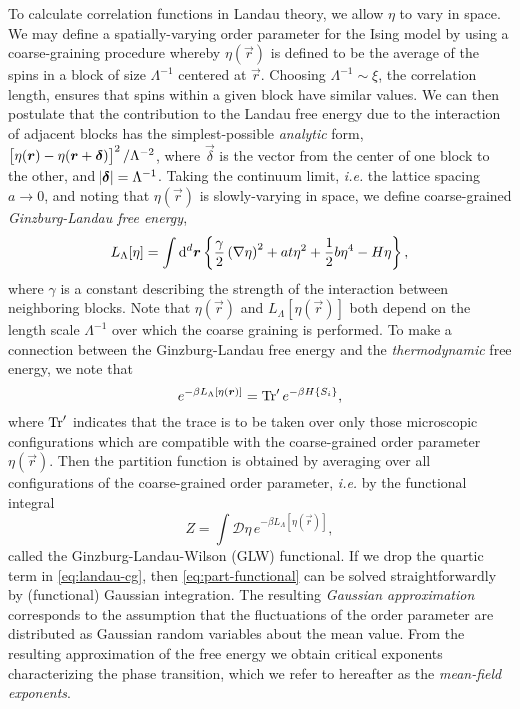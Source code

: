 To calculate correlation functions in Landau theory, we allow $\eta$ to vary in
space. We may define a spatially-varying order parameter for the Ising model by
using a coarse-graining procedure whereby $\eta(\vec{r})$ is defined to be the
average of the spins in a block of size $\Lambda^{-1}$ centered at $\vec{r}$.
Choosing $\Lambda^{-1} \sim \xi$, the correlation length, ensures that spins
within a given block have similar values. We can then postulate that the
contribution to the Landau free energy due to the interaction of adjacent
blocks has the simplest-possible \emph{analytic} form, $\left[\eta(\bm{r}) -
  \eta(\bm{r} + \bm{\delta})\right]^2/\Lambda^{-2}$, where $\vec{\delta}$ is the
vector from the center of one block to the other, and
$\abs{\bm{\delta}}=\Lambda^{-1}$. Taking the continuum limit, \textit{i.e.}
the lattice spacing $a \to 0$, and noting that $\eta(\vec{r})$ is
slowly-varying in space, we define coarse-grained \emph{Ginzburg-Landau free
  energy},
\begin{equation}
  L_{\Lambda}[\eta]
  = \int\dif^d \vec{r}
  \cbr{\frac{\gamma}{2}\del{
      \nabla\eta}^2 + a t \eta^2 + \frac{1}{2} b \eta^4 - H \eta},
  \label{eq:landau-cg}
\end{equation}
where $\gamma$ is a constant describing the strength of the interaction between
neighboring blocks. Note that $\eta(\vec{r})$ and $L_{\Lambda}[\eta(\vec{r})]$
both depend on the length scale $\Lambda^{-1}$ over which the coarse graining
is performed. To make a connection between the Ginzburg-Landau free energy and
the \emph{thermodynamic} free energy, we note that
\begin{equation}
  e^{-\beta L_{\Lambda}[\eta(\vec{r})]} = \Tr^{\prime} e^{-\beta H \cbr{S_i}},
\end{equation}
where $\operatorname{Tr}^{\prime}$ indicates that the trace is to be taken over only those
microscopic configurations which are compatible with the coarse-grained order
parameter $\eta(\vec{r})$. Then the partition function is obtained by averaging
over all configurations of the coarse-grained order parameter, \textit{i.e.} by
the functional integral
\begin{equation}
  Z = \int\mathcal{D}\eta \, e^{-\beta L_{\Lambda}[\eta(\vec{r})]},
  \label{eq:part-functional}
\end{equation}
called the Ginzburg-Landau-Wilson (GLW) functional. If we drop the quartic term
in \cref{eq:landau-cg}, then \cref{eq:part-functional} can be solved
straightforwardly by (functional) Gaussian integration. The resulting
\emph{Gaussian approximation} corresponds to the assumption that the
fluctuations of the order parameter are distributed as Gaussian random
variables about the mean value. From the resulting approximation of the free
energy we obtain critical exponents characterizing the phase transition, which
we refer to hereafter as the \emph{mean-field exponents}.

